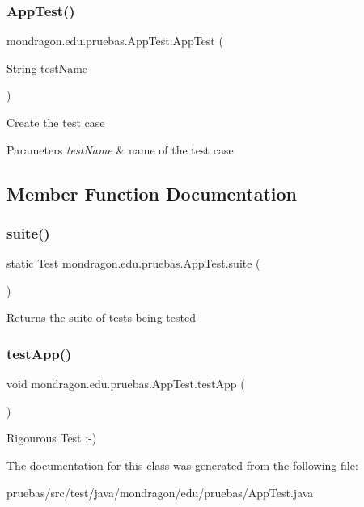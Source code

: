 \subsubsection{\texorpdfstring{App\+Test()}{AppTest()}}
{\footnotesize\ttfamily mondragon.\+edu.\+pruebas.\+App\+Test.\+App\+Test (\begin{DoxyParamCaption}\item[{String}]{test\+Name }\end{DoxyParamCaption})}

Create the test case


\begin{DoxyParams}{Parameters}
{\em test\+Name} & name of the test case \\
\hline
\end{DoxyParams}


\subsection{Member Function Documentation}
\mbox{\label{classmondragon_1_1edu_1_1pruebas_1_1_app_test_a74268ac7bf97d151c9f4c49293ce67d4}} 
\subsubsection{\texorpdfstring{suite()}{suite()}}
{\footnotesize\ttfamily static Test mondragon.\+edu.\+pruebas.\+App\+Test.\+suite (\begin{DoxyParamCaption}{ }\end{DoxyParamCaption})\hspace{0.3cm}{\ttfamily [static]}}

\begin{DoxyReturn}{Returns}
the suite of tests being tested 
\end{DoxyReturn}
\mbox{\label{classmondragon_1_1edu_1_1pruebas_1_1_app_test_a20f975819ae8283342687eb9f7c1d50c}} 
\subsubsection{\texorpdfstring{test\+App()}{testApp()}}
{\footnotesize\ttfamily void mondragon.\+edu.\+pruebas.\+App\+Test.\+test\+App (\begin{DoxyParamCaption}{ }\end{DoxyParamCaption})}

Rigourous Test \+:-\/) 

The documentation for this class was generated from the following file\+:\begin{DoxyCompactItemize}
\item 
pruebas/src/test/java/mondragon/edu/pruebas/App\+Test.\+java\end{DoxyCompactItemize}

